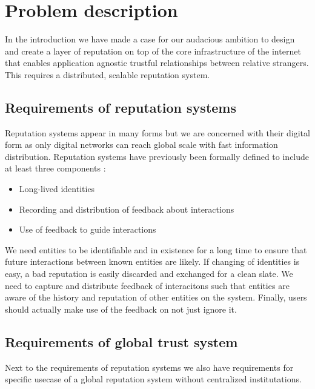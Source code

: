 \chapter{Problem description}
\label{chap:problem}
In the introduction we have made a case for our audacious ambition to design and create a layer 
of reputation on top of the core infrastructure of the internet that enables application agnostic 
trustful relationships between relative strangers. This requires a distributed, scalable reputation
system. 

\section{Requirements of reputation systems}
Reputation systems appear in many forms but we are concerned with their digital form as only
digital networks can reach global scale with fast information distribution. Reputation systems have
previously been formally defined to include at least three components \cite{resnick2000}:

\begin{itemize}
    \item Long-lived identities
    \item Recording and distribution of feedback about interactions
    \item Use of feedback to guide interactions
\end{itemize}

We need entities to be identifiable and in existence for a long time to ensure that future interactions
between known entities are likely. If changing of identities is easy, a bad reputation is easily 
discarded and exchanged for a clean slate. We need to capture and distribute feedback of interacitons
such that entities are aware of the history and reputation of other entities on the system. Finally,
users should actually make use of the feedback on not just ignore it.

\section{Requirements of global trust system}
Next to the requirements of reputation systems we also have requirements for specific usecase of a
global reputation system without centralized institutations.

